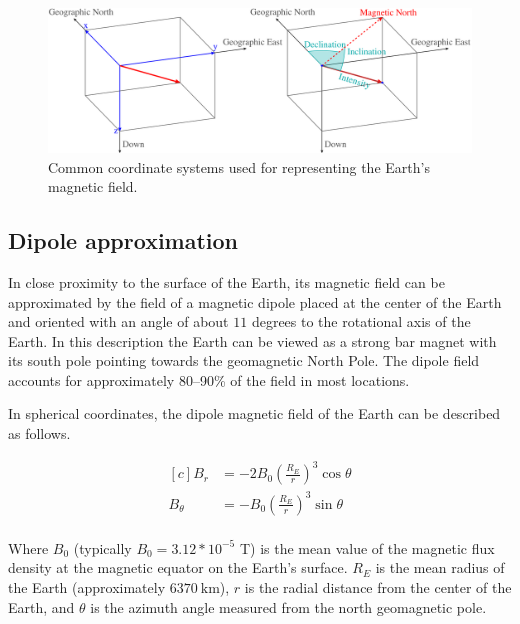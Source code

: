 \begin{figure}[hbt!]
    \centering
    \includegraphics[width=1.0\textwidth]{figures/earth_magnetic_field_coords.png}
    \caption{Common coordinate systems used for representing the Earth's magnetic field.}
    \label{fig:earth_magnetic_field_coords}
\end{figure}

\subsection{Dipole approximation}
\label{subsec:diple_approx}

In close proximity to the surface of the Earth, its magnetic field can be approximated by the field of a magnetic dipole placed at the center of the Earth and oriented with an angle of about $11$ degrees to the rotational axis of the Earth. In this description the Earth can be viewed as a strong bar magnet with its south pole pointing towards the geomagnetic North Pole. The dipole field accounts for approximately 80--90\% of the field in most locations.\cite{earth_magnetic}

In spherical coordinates, the dipole magnetic field of the Earth can be described as follows.\cite{earth_dipole}

\begin{equation}
\label{eq:dipole_approx}
    \begin{aligned}[c]
        B_r &= -2 B_0 ({\frac{R_E}{r}})^3 \cos \theta\\
        B_\theta &= - B_0 ({\frac{R_E}{r}})^3 \sin \theta\\
    \end{aligned}
\end{equation}

Where $B_0$ (typically $B_0 = 3.12*10^{-5}$ T) is the mean value of the magnetic flux density at the magnetic equator on the Earth's surface. $R_E$ is the mean radius of the Earth (approximately $6370\ \textrm{km}$), $r$ is the radial distance from the center of the Earth, and $\theta$ is the azimuth angle measured from the north geomagnetic pole.

